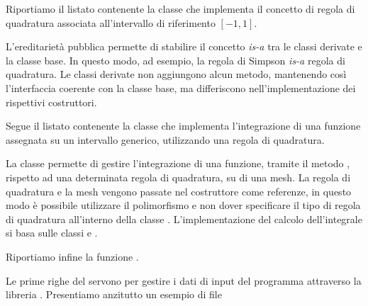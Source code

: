 Riportiamo il listato contenente la classe che implementa il concetto
di regola di quadratura associata all'intervallo di riferimento $[-1,1]$.

\lstset{basicstyle=\scriptsize\sf}
    
    
\lstset{basicstyle=\sf}

L'ereditariet\`a pubblica permette di stabilire il concetto \textit{is-a}
tra le classi derivate e la classe base. In questo modo, ad esempio,
la regola di Simpson \textit{is-a} regola di quadratura. Le classi derivate
non aggiungono alcun metodo, mantenendo cos\`i l'interfaccia coerente con
la classe base, ma differiscono nell'implementazione dei rispettivi costruttori.

Segue il listato contenente la classe  che implementa
l'integrazione di una funzione assegnata su un intervallo generico, utilizzando
una regola di quadratura.

\lstset{basicstyle=\scriptsize\sf}
    
    
\lstset{basicstyle=\sf}

La classe permette di gestire l'integrazione di una funzione, tramite il
metodo , rispetto ad una determinata regola di quadratura, su
di una mesh. La regola di quadratura e la mesh vengono passate nel
costruttore come referenze, in questo modo \`e possibile utilizzare il
polimorfismo e non dover specificare il tipo di regola di quadratura
all'interno della classe .
L'implementazione del calcolo dell'integrale si basa sulle classi
 e .

Riportiamo infine la funzione .

\lstset{basicstyle=\scriptsize\sf}
    
\lstset{basicstyle=\sf}

Le prime righe del  servono per gestire i dati di input del
programma attraverso la libreria . Presentiamo anzitutto
un esempio di file

